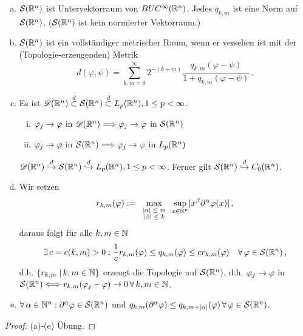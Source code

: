 \begin{bem}
\label{bem:8.4}
\begin{enumerate}[(a)]
\item $\mathcal S (\mathbb{R}^n)$ ist Untervektorraum von $BUC^\infty (\mathbb{R}^n)$. Jedes $q_{k,m}$ ist eine Norm auf $\mathcal S(\mathbb{R}^n)$. ($\mathcal S(\mathbb{R}^n)$ ist kein normierter Vektorraum.)
\item $\mathcal S(\mathbb{R}^n)$ ist ein vollständiger metrischer Raum, wenn er versehen ist mit der (Topologie-erzeugenden) Metrik
\[
	d(\varphi, \psi) = \sum_{k,m=0}^\infty 2^{-(k+m)} \frac{q_{k,m} (\varphi-\psi)}{1+q_{k,m} (\varphi-\psi)} \, .
\]
\item Es ist $\mathscr{D} (\mathbb{R}^n) \stackrel{d}\subset \mathcal S(\mathbb{R}^n) \stackrel{d}\subset L_p (\mathbb{R}^n), 1\leq p < \infty$.
\begin{enumerate}[(i)]
\item $\varphi_j \rightarrow \varphi$ in $\mathscr{D}(\mathbb{R}^n) \Longrightarrow \varphi_j \rightarrow \varphi$ in $\mathcal S(\mathbb{R}^n)$
\item  $ \varphi_j \rightarrow \varphi$ in $\mathcal S(\mathbb{R}^n) \Longrightarrow  \varphi_j \rightarrow \varphi$ in $L_p(\mathbb{R}^n)$
\end{enumerate}
\begin{notation}
$\mathscr{D}(\mathbb{R}^n) \stackrel{d}\hookrightarrow \mathcal S(\mathbb{R}^n) \stackrel{d}\hookrightarrow L_p(\mathbb{R}^n), 1 \leq p < \infty$.
Ferner gilt $\mathcal S(\mathbb{R}^n) \stackrel{d}\hookrightarrow C_0 (\mathbb{R}^n)$.
\end{notation}
\item Wir setzen
\[
	r_{k,m} (\varphi) := \max_{\scriptsize\begin{array}{c} \lvert \alpha\rvert \leq m \\ \lvert \beta\rvert \leq k \end{array}} \sup_{x \in \mathbb{R}^n} \lvert x^\beta \partial^\alpha \varphi (x)\rvert \, ,
\]
daraus folgt für alle $k,m\in \mathbb{N}$
\[
	\exists \, c = c(k,m) > 0 : \frac 1 c r_{k,m} (\varphi) \leq q_{k,m}(\varphi) \leq cr_{k,m} (\varphi) \quad \forall \, \varphi \in \mathcal S(\mathbb{R}^n) \, ,
\]
d.h. $\{r_{k,m} \;\vert\, k,m \in \mathbb{N}\}$ erzeugt die Topologie auf $\mathcal S(\mathbb{R}^n)$, d.h. $\varphi_j \rightarrow \varphi$ in $\mathcal S(\mathbb{R}^n) \Longleftrightarrow r_{k,m} (\varphi_j - \varphi) \rightarrow 0 \, \forall \, k,m \in \mathbb{N}$.
\item $\forall \, \alpha \in \mathbb{N}^n: \partial^\alpha \varphi\in \mathcal S(\mathbb{R}^n)$ und $q_{k,m} (\partial^\alpha \varphi) \leq q_{k,m+\lvert \alpha\rvert} (\varphi) \, \forall \, \varphi \in \mathcal S(\mathbb{R}^n)$.
\end{enumerate}
\begin{proof}
(a)-(e) Übung.
\end{proof}
\end{bem}

